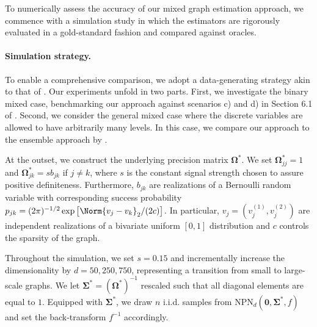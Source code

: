 To numerically assess the accuracy of our mixed graph estimation approach, we commence with a simulation study in which the estimators are rigorously evaluated in a gold-standard fashion and compared against oracles.
\paragraph{Simulation strategy.}
To enable a comprehensive comparison, we adopt a data-generating strategy akin to that of \cite{Fan17}. Our experiments unfold in two parts. First, we investigate the binary mixed case, benchmarking our approach against scenarios c) and d) in Section 6.1 of \cite{Fan17}. Second, we consider the general mixed case where the discrete variables are allowed to have arbitrarily many levels. In this case, we compare our approach to the ensemble approach by \cite{Feng19}.




At the outset, we construct the underlying precision matrix $\mathbf{\Omega}^*$. We set $\mathbf{\Omega}^*_{jj} = 1$ and $\mathbf{\Omega}_{jk}^* = s b_{jk}$ if $j\neq k$, where $s$ is the constant signal strength chosen to assure positive definiteness. Furthermore, $b_{jk}$ are realizations of a Bernoulli random variable with corresponding success probability $p_{jk} = (2\pi)^{-1/2} \exp\big[\Norm{v_j - v_k}_2 / (2c) \big]$. In particular, $v_j = (v_j^{(1)}, v_j^{(2)})$ are independent realizations of a bivariate uniform $[0,1]$ distribution and $c$ controls the sparsity of the graph.

Throughout the simulation, we set $s = 0.15$ and incrementally increase the dimensionality by $d= 50,250,750$, representing a transition from small to large-scale graphs. We let $\mathbf{\Sigma}^* = (\mathbf{\Omega}^*)^{-1}$ rescaled such that all diagonal elements are equal to $1$. Equipped with $\mathbf\Sigma^*$, we draw $n$ i.i.d. samples from $\text{NPN}_d(\mathbf{0}, \mathbf{\Sigma}^*, f)$ and set the back-transform \(f^{-1}\) accordingly.

